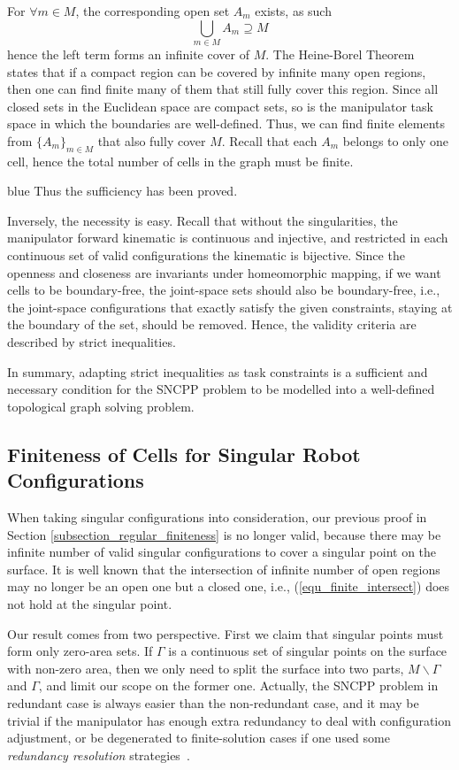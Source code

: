 \documentclass[Afour,sageh,times]{sagej}
\begin{document}
For $\forall m\in M$, the corresponding open set $A_m$ exists, as such %
\begin{equation}
\bigcup\limits_{m\in M}A_m\supseteq M
\end{equation}
hence the left term forms an infinite cover of $M$. 
The Heine-Borel Theorem~\cite{Simmons1964Introduction} states that if a compact region can be covered by infinite many open regions, then one can find finite many of them that still fully cover this region. Since all closed sets in the Euclidean space are compact sets, so is the manipulator 
task space in which the boundaries are well-defined. Thus, we can find finite elements from $\{A_m\}_{m\in M}$ that also fully 
cover $M$. Recall that each $A_m$ belongs to only one cell, hence the total number of cells in the graph must be finite. 
\begin{color}{blue}
Thus the sufficiency has been proved.

Inversely, the necessity is easy. Recall that without the singularities, the manipulator forward kinematic is continuous and injective, and restricted in each continuous set of valid configurations the kinematic is bijective. 
Since the openness and closeness are invariants under homeomorphic mapping, if we want cells to be boundary-free, the joint-space sets should also be boundary-free, i.e., the joint-space configurations that exactly satisfy the given constraints, staying at the boundary of the set, should be removed. Hence, the validity criteria are described by strict inequalities. 

In summary, adapting strict inequalities as task constraints is a sufficient and necessary condition for the SNCPP problem to be modelled into a well-defined topological graph solving problem. 

\subsection{Finiteness of Cells for Singular Robot Configurations}
\label{subsection_all_finiteness}
When taking singular configurations into consideration, our previous proof in Section \ref{subsection_regular_finiteness} is no longer valid, because there may be infinite number of valid singular configurations to cover a singular point on the surface. 
It is well known that the intersection of infinite number of open regions may no longer be an open one but a closed one, i.e., (\ref{equ_finite_intersect}) does not hold at the singular point. 

Our result comes from two perspective. 
First we claim that singular points must form only zero-area sets. If $\Gamma$ is a continuous set of singular points on the surface with non-zero area, then we only need to split the surface into two parts, $M\backslash \Gamma$ and $\Gamma$, and limit our scope on the former one. Actually, the SNCPP problem in redundant case is always easier than the non-redundant case, and it may be trivial if the manipulator has enough extra redundancy to deal with configuration adjustment, or be degenerated to finite-solution cases if one used some \textit{redundancy resolution} strategies~\cite{Hauser2018Global}.  


\end{color}
\end{document}
